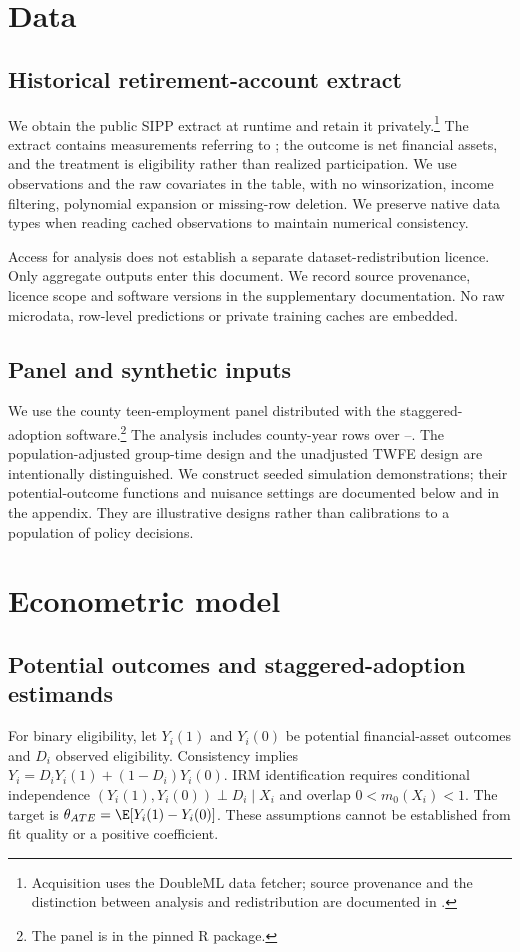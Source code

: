 \section{Data}

\subsection{Historical retirement-account extract}
We obtain the public SIPP extract at runtime and retain it privately.\footnote{Acquisition uses the DoubleML data fetcher; source provenance and the distinction between analysis and redistribution are documented in .} The \SIPPExtractYear{} extract contains measurements referring to \SIPPYear{}; the outcome is net financial assets, and the treatment is eligibility rather than realized participation. We use \SampleN{} observations and the raw covariates in the table, with no winsorization, income filtering, polynomial expansion or missing-row deletion. We preserve native data types when reading cached observations to maintain numerical consistency.

Access for analysis does not establish a separate dataset-redistribution licence. Only aggregate outputs enter this document. We record source provenance, licence scope and software versions in the supplementary documentation. No raw microdata, row-level predictions or private training caches are embedded.
\subsection{Panel and synthetic inputs}
We use the county teen-employment panel distributed with the staggered-adoption software.\footnote{The panel is  in the pinned R  package.} The analysis includes \MPRows{} county-year rows over \MPStart{}--\MPEnd{}. The population-adjusted group-time design and the unadjusted TWFE design are intentionally distinguished. We construct seeded simulation demonstrations; their potential-outcome functions and nuisance settings are documented below and in the appendix. They are illustrative designs rather than calibrations to a population of policy decisions.
\section{Econometric model}
\subsection{Potential outcomes and staggered-adoption estimands}
For binary eligibility, let $Y_i(1)$ and $Y_i(0)$ be potential financial-asset outcomes and $D_i$ observed eligibility. Consistency implies $Y_i=D_iY_i(1)+(1-D_i)Y_i(0)$. IRM identification requires conditional independence $(Y_i(1), Y_i(0))\perp D_i\mid X_i$ and overlap $0<m_0(X_i)<1$. The target is $\theta_{ATE}=\E[Y_i(1)-Y_i(0)]$. These assumptions cannot be established from fit quality or a positive coefficient.


